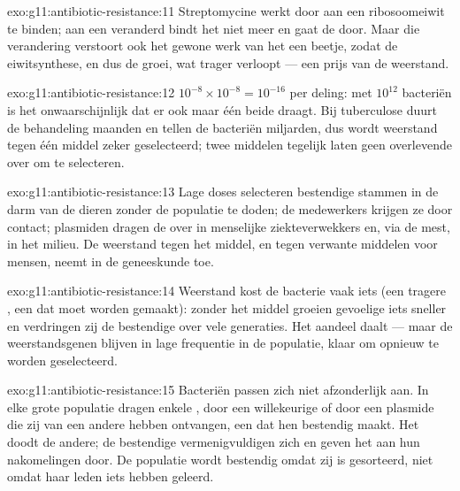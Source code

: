 \begin{solution}{exo:g11:antibiotic-resistance:11}
Streptomycine werkt door aan een ribosoomeiwit te binden; aan een
veranderd  bindt het niet meer en gaat de  door. Maar die
verandering verstoort ook het gewone werk van het  een beetje,
zodat de eiwitsynthese, en dus de groei, wat trager verloopt --- een prijs
van de weerstand.
\end{solution}

\begin{solution}{exo:g11:antibiotic-resistance:12}
$10^{-8} \times 10^{-8} = 10^{-16}$ per deling: met $10^{12}$ bacteriën
is het onwaarschijnlijk dat er ook maar één  beide draagt. Bij
tuberculose duurt de behandeling maanden en tellen de bacteriën
miljarden, dus wordt weerstand tegen één middel zeker geselecteerd; twee
middelen tegelijk laten geen overlevende over om te selecteren.
\end{solution}

\begin{solution}{exo:g11:antibiotic-resistance:13}
Lage doses selecteren bestendige stammen in de darm van de dieren zonder
de populatie te doden; de medewerkers krijgen ze door contact; plasmiden
dragen de  over in menselijke ziekteverwekkers en, via de mest, in
het milieu. De weerstand tegen het middel, en tegen verwante middelen voor
mensen, neemt in de geneeskunde toe.
\end{solution}

\begin{solution}{exo:g11:antibiotic-resistance:14}
Weerstand kost de bacterie vaak iets (een tragere , een  dat
moet worden gemaakt): zonder het middel groeien gevoelige  iets
sneller en verdringen zij de bestendige over vele generaties. Het aandeel
daalt --- maar de weerstandsgenen blijven in lage frequentie in de
populatie, klaar om opnieuw te worden geselecteerd.
\end{solution}

\begin{solution}{exo:g11:antibiotic-resistance:15}
Bacteriën passen zich niet afzonderlijk aan. In elke grote populatie
dragen enkele , door een willekeurige  of door een plasmide
die zij van een andere  hebben ontvangen, een  dat hen bestendig
maakt. Het  doodt de andere; de bestendige 
vermenigvuldigen zich en geven het  aan hun nakomelingen door. De
populatie wordt bestendig omdat zij is gesorteerd, niet omdat haar leden
iets hebben geleerd.
\end{solution}

